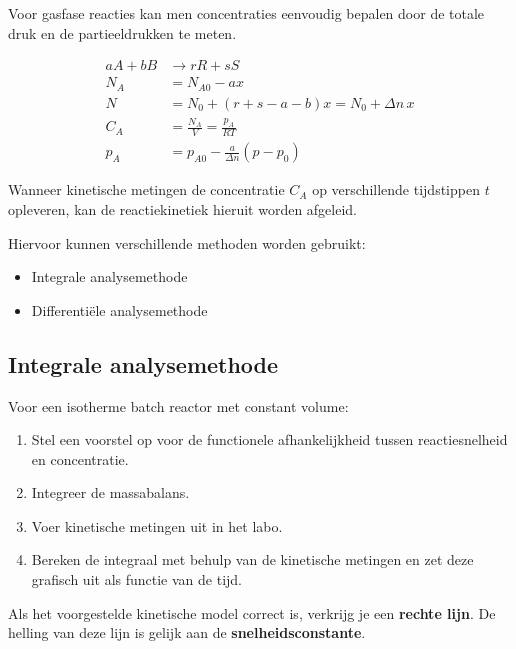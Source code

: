 \documentclass{ximera}
\begin{document}
\begin{example}
Voor gasfase reacties kan men concentraties eenvoudig bepalen door de totale druk en de partieeldrukken te meten.

\[
\begin{aligned}
aA + bB &\rightarrow rR + sS \\[6pt]
N_A &= N_{A0} - ax \\
N &= N_0 + (r + s - a - b)x = N_0 + \Delta n\,x \\[6pt]
C_A &= \frac{N_A}{V} = \frac{p_A}{RT} \\
p_A &= p_{A0} - \frac{a}{\Delta n}(p - p_0)
\end{aligned}
\]
\end{example}

Wanneer kinetische metingen de concentratie $C_A$ op verschillende tijdstippen $t$ opleveren, 
kan de reactiekinetiek hieruit worden afgeleid. 

Hiervoor kunnen verschillende methoden worden gebruikt:
\begin{itemize}
    \item Integrale analysemethode
    \item Differentiële analysemethode
\end{itemize}


\subsection*{Integrale analysemethode}

Voor een isotherme batch reactor met constant volume:

\begin{enumerate}
\item Stel een voorstel op voor de functionele afhankelijkheid tussen
reactiesnelheid en concentratie.
\item Integreer de massabalans.
\item Voer kinetische metingen uit in het labo.
\item Bereken de integraal met behulp van de kinetische metingen
en zet deze grafisch uit als functie van de tijd.
\end{enumerate}

Als het voorgestelde kinetische model correct is, verkrijg je een
\textbf{rechte lijn}. De helling van deze lijn is gelijk aan de
\textbf{snelheidsconstante}.
\end{document}
